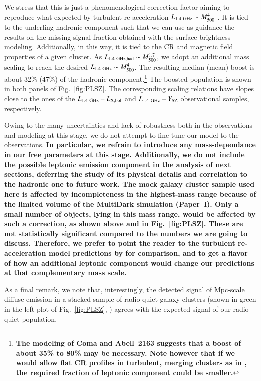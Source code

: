\documentclass[useAMS,usenatbib]{mn2e}
\begin{document}
{We stress that this is just a phenomenological correction factor aiming to reproduce what 
expected by turbulent re-acceleration $L_{1.4~{\mathrm{GHz}}} \sim M_{500}^4$ 
\citep{2007MNRAS.378.1565C,2013arXiv1306.4379C}.
It is tied to the underling hadronic component such that we can use as
guidance the results on the missing signal fraction obtained with the 
surface brightness modeling. Additionally, in this way, it is tied to the
CR and magnetic field properties of a given cluster.  
As $L_{1.4~{\mathrm{GHz, had}}} \sim M_{500}^{1.7}$,
we adopt an additional mass scaling to reach the
desired $L_{1.4~{\mathrm{GHz}}} \sim M_{500}^4$.
The resulting median (mean) boost is about
32\% (47\%) of the hadronic component.\footnote{{\bf The modeling of
   Coma and Abell~2163 suggests that a boost of about 35\% to 80\%
   may be necessary. Note however that if we would allow flat CR profiles 
   in turbulent, merging clusters as in \cite{2013arXiv1303.4746W},
   the required fraction of leptonic component could be smaller.}} 
The boosted population is shown in both panels of Fig.~\ref{fig:PLSZ}. The 
corresponding scaling relations have slopes close to the ones of 
the $L_{1.4~{\mathrm{GHz}}}-L_{{\mathrm{X,bol}}}$ and $L_{1.4~{\mathrm{GHz}}}-Y_{{\mathrm{SZ}}}$ 
observational samples, respectively.}

Owing to the many uncertainties and lack of robustness both in the observations 
and modeling at this stage, we do not attempt to fine-tune our model to the
observations. {\bf In particular, we refrain to introduce any 
mass-dependance in our free parameters at this stage.
Additionally, we do not include the possible leptonic emission 
component in the analysis of next sections, deferring the study of its 
physical details and correlation to the hadronic one to future work. 
The mock galaxy cluster sample used here is affected by incompleteness 
in the highest-mass range because of the limited volume of the MultiDark simulation 
(Paper~I). Only a small number of objects, lying in this mass range, would be affected 
by such a correction, as shown above and in Fig.~\ref{fig:PLSZ}. These are not statistically 
significant compared to the numbers we are going to discuss. Therefore, we prefer to point the 
reader to the turbulent re-acceleration model predictions by \cite{2010A&A...509A..68C, 
2012arXiv1210.1020C} for comparison, and to get a flavor of how an additional leptonic 
component would change our predictions at that complementary mass scale.} 

As a final remark, we note that, interestingly, the detected signal of Mpc-scale diffuse 
emission in a stacked sample of radio-quiet galaxy clusters (shown in green in the
left plot of Fig.~\ref{fig:PLSZ}, \citealp{2011ApJ...740L..28B})
agrees with the expected signal of our radio-quiet population.
\end{document}
